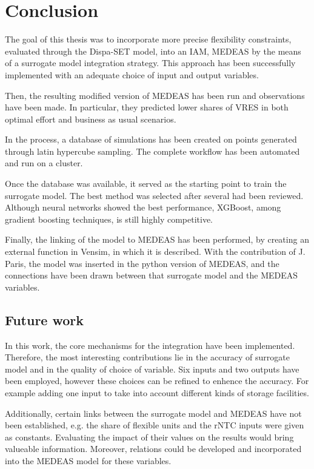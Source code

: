 \section{Conclusion}

The goal of this thesis was to incorporate more precise flexibility constraints, evaluated through the Dispa-SET model, into an IAM, MEDEAS by the means of a surrogate model integration strategy. This approach has been successfully implemented with an adequate choice of input and output variables.

Then, the resulting modified version of MEDEAS has been run and observations have been made. In particular, they predicted lower shares of VRES in both optimal effort and business as usual scenarios.

In the process, a database of simulations has been created on points generated through latin hypercube sampling. The complete workflow has been automated and run on a cluster.

Once the database was available, it served as the starting point to train the surrogate model. The best method was selected after several had been reviewed. Although neural networks showed the best performance, XGBoost, among gradient boosting techniques, is still highly competitive.

Finally, the linking of the model to MEDEAS has been performed, by creating an external function in Vensim, in which it is described. With the contribution of J. Paris, the model was inserted in the python version of MEDEAS, and the connections have been drawn between that surrogate model and the MEDEAS variables.

\subsection{Future work}

In this work, the core mechanisms for the integration have been implemented. Therefore, the most interesting contributions lie in the accuracy of surrogate model and in the quality of choice of variable. Six inputs and two outputs have been employed, however these choices can be refined to enhence the accuracy. For example adding one input to take into account different kinds of storage facilities.

Additionally, certain links between the surrogate model and MEDEAS have not been established, e.g. the share of flexible units and the rNTC inputs were given as constants. Evaluating the impact of their values on the results would bring valueable information. Moreover, relations could be developed and incorporated into the MEDEAS model for these variables.